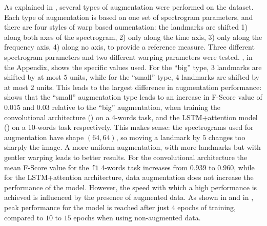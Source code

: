 As explained in , several types of augmentation
were performed on the dataset.
%
%
Each type of augmentation is based on one set of spectrogram parameters, and
there are four styles of warp based aumentation: the landmarks are shifted 1)
along both axes of the spectrogram, 2) only along the time axis, 3) only along
the frequency axis, 4) along no axis, to provide a reference measure. Three
different spectrogram parameters and two different warping parameters were
tested. , in the Appendix, shows the specific values used.
For the ``big'' type, $3$ landmarks are shifted by at most $5$ units, while for
the ``small'' type, $4$ landmarks are shifted by at most $2$ units.
This leads to the largest difference in augmentation performance:
 shows that the ``small''
augmentation type leads to an increase in F-Score value of $0.015$ and $0.03$
relative to the ``big'' augmentation, when training the convolutional
architecture () on a 4-words task, and the
LSTM+attention model () on a 10-words task
respectively.
%
This makes sense: the spectrograms used for augmentation have shape $(64, 64)$,
so moving a landmark by $5$ changes too sharply the image. A more uniform
augmentation, with more landmarks but with gentler warping leads to better
results.
%
For the convolutional architecture the mean F-Score value for the \texttt{f1}
4-words task increases from $0.939$ to $0.960$, while for the LSTM+attention
architecture, data augmentation does not increase the performance of the model.
However, the speed with which a high performance is achieved is influenced by
the presence of augmented data. As shown in
 and in
, peak performance for the model is
reached after just $4$ epochs of training, compared to $10$ to $15$ epochs when
using non-augmented data.

